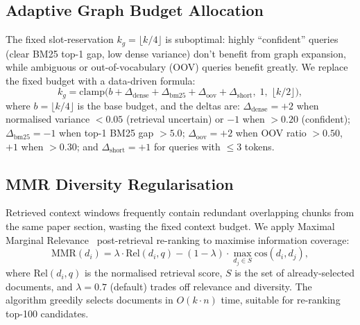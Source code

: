 \documentclass[journal]{IEEEtran}
\begin{document}
\subsection{Adaptive Graph Budget Allocation}
\label{sec:adaptive_budget}
The fixed slot-reservation $k_g = \lfloor k/4 \rfloor$ is suboptimal:
highly ``confident'' queries (clear BM25 top-1 gap, low dense variance)
don't benefit from graph expansion, while ambiguous or out-of-vocabulary
(OOV) queries benefit greatly. We replace the fixed budget with a
data-driven formula:
\begin{equation}
  k_g = \mathrm{clamp}\!\bigl(b + \Delta_{\text{dense}} + \Delta_{\text{bm25}}
        + \Delta_{\text{oov}} + \Delta_{\text{short}},\; 1,\; \lfloor k/2 \rfloor\bigr),
  \label{eq:adaptive}
\end{equation}
where $b = \lfloor k/4 \rfloor$ is the base budget, and the deltas are:
$\Delta_{\text{dense}} = +2$ when normalised variance
$<0.05$ (retrieval uncertain) or $-1$ when $>0.20$ (confident);
$\Delta_{\text{bm25}} = -1$ when top-1 BM25 gap $>5.0$;
$\Delta_{\text{oov}} = +2$ when OOV ratio $>0.50$, $+1$ when $>0.30$;
and $\Delta_{\text{short}} = +1$ for queries with $\leq 3$ tokens.

\subsection{MMR Diversity Regularisation}
\label{sec:mmr}
Retrieved context windows frequently contain redundant overlapping
chunks from the same paper section, wasting the fixed context budget.
We apply Maximal Marginal Relevance~\cite{carbonell1998mmr}
post-retrieval re-ranking to maximise information coverage:
\begin{equation}
  \text{MMR}(d_i) = \lambda \cdot \text{Rel}(d_i, q)
    - (1 - \lambda) \cdot \max_{d_j \in S}\text{cos}(d_i, d_j),
  \label{eq:mmr}
\end{equation}
where $\text{Rel}(d_i, q)$ is the normalised retrieval score,
$S$ is the set of already-selected documents, and $\lambda = 0.7$
(default) trades off relevance and diversity. The algorithm greedily
selects documents in $O(k \cdot n)$ time, suitable for re-ranking
top-100 candidates.
\end{document}
